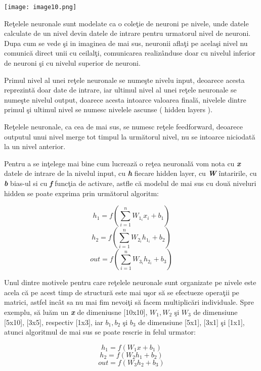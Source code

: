 \texttt{[image: image10.png]}

Re\c{t}elele neuronale sunt modelate ca o cole\c{t}ie de neuroni pe nivele, unde datele calculate de un nivel devin datele de intrare pentru urmatorul nivel de neuroni. Dupa cum se vede \c{s}i in imaginea de mai sus, neuronii afla\c{t}i pe acela\c{s}i nivel nu comunic\u{a} direct unii cu ceilal\c{t}i, comunicarea realiz\^{a}nduse doar cu nivelul inferior de neuroni \c{s}i cu nivelul superior de neuroni.
\par
Primul nivel al unei re\c{t}ele neuronale se nume\c{s}te nivelu input, deoarece acesta reprezint\u{a} doar date de intrare, iar ultimul nivel al unei re\c{t}ele neuronale se nume\c{s}te nivelul output, doarece acesta intoarce valoarea final\u{a}, nivelele dintre primul \c{s}i ultimul nivel se numesc nivelele ascunse ( hidden layers ).
\par
Re\c{t}elele neuronale, ca cea de mai sus, se numesc re\c{t}ele feedforward, deoarece outputul unui nivel merge tot timpul la urm\u{a}torul nivel, nu se intoarce niciodat\u{a} la un nivel anterior.
\par 
Pentru a se in\c{t}elege mai bine cum lucreaz\u{a} o re\c{t}ea neuronal\u{a} vom nota cu \textbf{\textit{x}} datele de intrare de la nivelul input, cu \textbf{\textit{h}} fiecare hidden layer, cu \textbf{\textit{W}} \^{i}ntaririle, cu \textbf{\textit{b}} bias-ul si cu \textbf{\textit{f}} func\c{t}ia de activare, astfle c\u{a} modelul de mai sus cu dou\u{a} niveluri hidden se poate exprima prin urm\u{a}torul algoritm:

$$h_1 = f( \sum_{i=1}^{n} W_1_i x_i + b_1 ) $$
$$h_2 = f( \sum_{i=1}^{n} W_2_i h_1_i + b_2 ) $$
$$out = f( \sum_{i=1}^{n} W_3_i h_2_i + b_3 ) $$

\par

Unul dintre motivele pentru care re\c{t}elele neuronale sunt organizate pe nivele este acela c\u{a} pe acest timp de structur\u{a} este mai u\c{s}or s\u{a} se efectueze opera\c{t}ii pe matrici, astfel inc\^{a}t sa nu mai fim nevoi\c{t}i s\u{a} facem multiplic\u{a}ri individuale. Spre exemplu, s\u{a} lu\u{a}m un \textbf{\textit{x}} de dimeniusne [10x10], $W_1, W_2 $ \c{s}i $W_3$ de dimensiune [5x10], [3x5], respectiv [1x3], iar $b_1, b_2 $ \c{s}i $b_3$ de dimensiune [5x1], [3x1] \c{s}i [1x1], atunci algoritmul de mai sus se poate rescrie in felul urmator: 

$$h_1 = f( W_1 x + b_1 ) $$
$$h_2 = f( W_2 h_1 + b_2 ) $$
$$out = f( W_3 h_2 + b_3 ) $$

